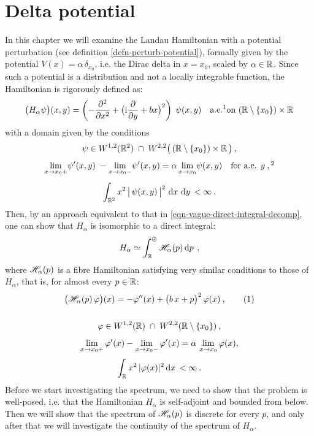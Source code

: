 \chapter{Delta potential}
In this chapter we will examine the Landau Hamiltonian with a potential perturbation (see definition \ref{defn-perturb-potential}), formally given by the potential $V(x) = \alpha\,\delta_{x_0}$, i.e. the Dirac delta in $x=x_0$, scaled by $\alpha \in \mathbb{R}$. Since such a potential is a distribution and not a locally integrable function, the Hamiltonian is rigorously defined as:
\begin{equation*}
    \big( H_\alpha \psi \big)(x, y) = \left( -\pd{^2}{x^2} + \big( \i\pd{}{y} + bx \big)^2 \right) \; \psi(x,y)
    \quad \text{a.e.\footnotemark on } (\R \setminus \{ x_0 \}) \times \R
\end{equation*}
with a domain given by the conditions
\begin{gather*}
    \psi \in W^{1,2}(\R^2) \; \cap \; W^{2,2}\big( \,(\R \setminus \{ x_0 \}) \times \R \, \big) \: ,
    \\[5pt]
    \lim_{x \to x_0 +} \!\psi'(x,y)\; - \lim_{x \to x_0 -} \!\psi'(x,y) = \alpha \lim_{x \to x_0} \!\psi(x, y)
    \quad \text{for a.e. } y \: ,\footnotemark
    \\[5pt]
    \int_{\R^2} x^2 \, \big|\, \psi(x,y) \,\big|^2 \, \d{x}\d{y} < \infty \: .
\end{gather*}
Then, by an approach equivalent to that in \eqref{eqn-vague-direct-integral-decomp}, one can show that $H_\alpha$ is isomorphic to a direct integral:
\begin{equation*}
    H_\alpha \simeq \int^\oplus_{\mathbb{R}} \mathscr{H}_\alpha(p) \, \mathrm{d}p \, \: ,
\end{equation*}
where $\mathscr{H}_\alpha(p)$ is a fibre Hamiltonian satisfying very similar conditions to those of~$H_\alpha$, that is, for almost every $p \in \mathbb{R}$:
\begin{gather*}
    \big( \Hf_\alpha(p) \, \varphi \big)(x)
    = -\varphi''(x)
    + \big( b \, x + p \big)^2 \, \varphi(x) \: ,
    \numberthis\label{eqn-dirac-fibre-hamiltonian}
    \\[15pt]
    \varphi \in W^{1,2}(\R) \; \cap \; W^{2,2}( \R \setminus \{ x_0 \}) \: ,
    \\[5pt]
    \lim_{x \to x_0+} \varphi'(x) - \lim_{x \to x_0-} \varphi'(x) = \alpha \, \lim_{x \to x_0} \varphi(x),
    \\[3pt]
    \int_\R x^2 \, |\varphi(x)|^2 \d{x} < \infty \: .
\end{gather*}
Before we start investigating the spectrum, we need to show that the problem is well-posed, i.e. that the Hamiltonian $H_\alpha$ is self-adjoint and bounded from below. Then we will show that the spectrum of $\mathscr{H}_\alpha(p)$ is discrete for every $p$, and only after that we will investigate the continuity of the spectrum of $H_\alpha$.

